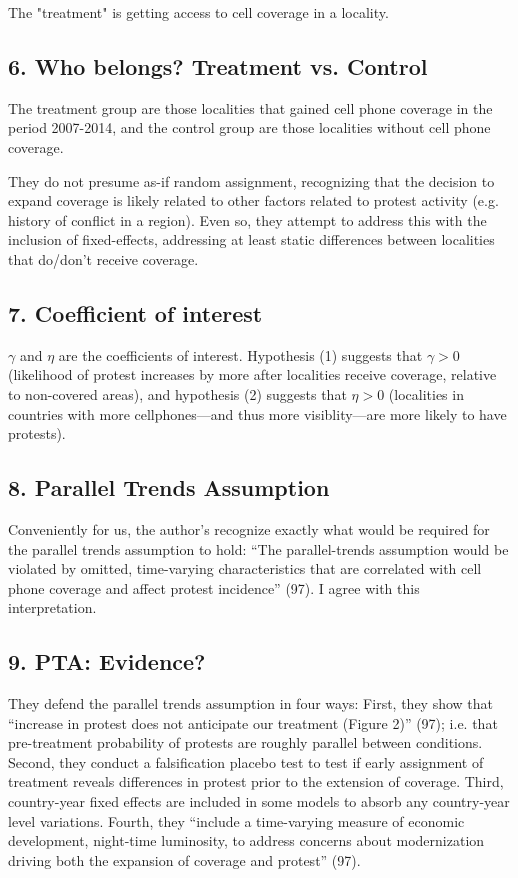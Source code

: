 \documentclass{article}
\begin{document}
The "treatment" is getting access to cell coverage in a locality.

\subsection*{6. Who belongs? Treatment vs. Control}

The treatment group are those localities that gained cell phone coverage in the period 2007-2014, and the control group are those localities without cell phone coverage.

They do not presume as-if random assignment, recognizing that the decision to expand coverage is likely related to other factors related to protest activity (e.g. history of conflict in a region). Even so, they attempt to address this with the inclusion of fixed-effects, addressing at least static differences between localities that do/don't receive coverage.

\subsection*{7. Coefficient of interest}

$\gamma$ and $\eta$ are the coefficients of interest. Hypothesis (1) suggests that $\gamma > 0$ (likelihood of protest increases by more after localities receive coverage, relative to non-covered areas), and hypothesis (2) suggests that $\eta > 0$ (localities in countries with more cellphones—and thus more visiblity—are more likely to have protests).

\subsection*{8. Parallel Trends Assumption}

Conveniently for us, the author's recognize exactly what would be required for the parallel trends assumption to hold: ``The parallel-trends assumption would be violated by omitted, time-varying characteristics that are correlated with cell phone coverage and affect protest incidence'' (97). I agree with this interpretation.

\subsection*{9. PTA: Evidence?}

They defend the parallel trends assumption in four ways: First, they show that ``increase in protest does not anticipate our treatment (Figure 2)'' (97); i.e. that pre-treatment probability of protests are roughly parallel between conditions. 
Second, they conduct a falsification placebo test to test if early assignment of treatment reveals differences in protest prior to the extension of coverage.
Third, country-year fixed effects are included in some models to absorb any country-year level variations. 
Fourth, they ``include a time-varying measure of economic development, night-time luminosity, to address concerns about modernization driving both the expansion of coverage and protest'' (97).
\end{document}
